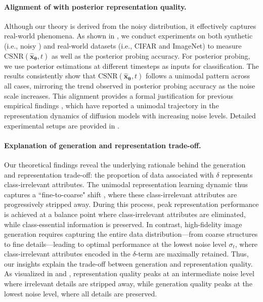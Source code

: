 \paragraph{Alignment of \CSNR\;with posterior representation quality.} Although our theory is derived from the noisy \MoLRG\; distribution, it effectively captures real-world phenomena. As shown in , we conduct experiments on both synthetic (i.e., noisy \MoLRG) and real-world datasets (i.e., CIFAR and ImageNet) to measure $\mathrm{CSNR}(\hat{\bm x}_{\bm \theta},t)$ as well as the posterior probing accuracy. For posterior probing, we use posterior estimations at different timesteps as inputs for classification. The results consistently show that $\mathrm{CSNR}(\hat{\bm x}_{\bm \theta},t)$ follows a unimodal pattern across all cases, mirroring the trend observed in posterior probing accuracy as the noise scale increases. This alignment provides a formal justification for previous empirical findings \citep{xiang2023denoising, baranchuk2021label, tang2023emergent}, which have reported a unimodal trajectory in the representation dynamics of diffusion models with increasing noise levels. Detailed experimental setups are provided in .

\paragraph{Explanation of generation and representation trade-off.}
Our theoretical findings reveal the underlying rationale behind the generation and representation trade-off: the proportion of data associated with $\delta$ represents class-irrelevant attributes. The unimodal representation learning dynamic thus captures a ``fine-to-coarse" shift \citep{choi2022perception, wang2023diffusion}, where these class-irrelevant attributes are progressively stripped away. During this process, peak representation performance is achieved at a balance point where class-irrelevant attributes are eliminated, while class-essential information is preserved. In contrast, high-fidelity image generation requires capturing the entire data distribution—from coarse structures to fine details—leading to optimal performance at the lowest noise level $\sigma_t$, where class-irrelevant attributes encoded in the $\delta$-term are maximally retained. Thus, our insights explain the trade-off between generation and representation quality. As visualized in  and , representation quality peaks at an intermediate noise level where irrelevant details are stripped away, while generation quality peaks at the lowest noise level, where all details are preserved.
    

